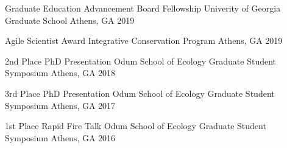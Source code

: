 



\begin{cvhonors}
  \cvhonor
    {Graduate Education Advancement Board Fellowship}
    {Univerity of Georgia Graduate School}
    {Athens, GA}
    {2019}

  \cvhonor
    {Agile Scientist Award}
    {Integrative Conservation Program}
    {Athens, GA}
    {2019}

  \cvhonor
    {2nd Place PhD Presentation}
    {Odum School of Ecology Graduate Student Symposium}
    {Athens, GA}
    {2018}

  \cvhonor
    {3rd Place PhD Presentation}
    {Odum School of Ecology Graduate Student Symposium}
    {Athens, GA}
    {2017}

  \cvhonor
    {1st Place Rapid Fire Talk} %
    {Odum School of Ecology Graduate Student Symposium} %
    {Athens, GA} %
    {2016} %

\end{cvhonors}

\medskip

